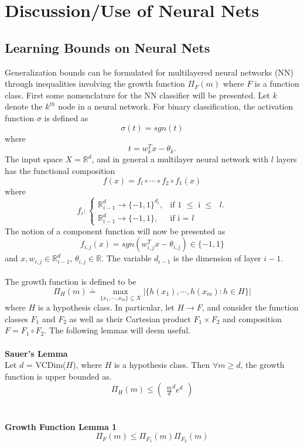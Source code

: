 \documentclass{article} %
\begin{document}
\section{Discussion/Use of Neural Nets}
\subsection{Learning Bounds on Neural Nets}
Generalization bounds can be formulated for multilayered neural networks (NN) through inequalities involving the growth function $\Pi_F(m)$ where $F$ is a function class. First some nomenclature for the NN classifier will be presented. Let $k$ denote the $k^{th}$ node in a neural network. For binary classification, the activation function $\sigma$ is defined as
$$
\sigma(t) = sgn(t)
$$
where
$$
t = w_k^Tx - \theta_k.
$$
The input space $X = \mathbb{R}^d$, and in general a multilayer neural network with $l$ layers has the functional composition
$$
f(x) = f_l \circ \cdots \circ f_2 \circ f_1 (x)
$$
where
$$
f_i : \begin{cases}
    \mathbb{R}^d_{i-1} \rightarrow \{-1,1\}^{d_i}, & \text{if 1 $\leq$ i $\leq$ $l$}.\\
    \mathbb{R}^d_{i-1} \rightarrow \{-1,1\}, & \text{if i = $l$}
  \end{cases}
$$
The notion of a component function will now be presented as
$$
f_{i,j}(x) = sgn(w_{i,j}^Tx - \theta_{i,j}) \in \{-1,1\}
$$
and $x,w_{i,j} \in \mathbb{R}^d_{i-1}$, $\theta_{i,j} \in \mathbb{R}$. The variable $d_{i-1}$ is the dimension of layer $i-1$.
\\
\\
The growth function is defined to be
$$
\Pi_H(m) \doteq \max_{\{x_1,\cdots,x_m\} \subseteq X} |\{h(x_1),\cdots,h(x_m) : h \in H \} |
$$
where $H$ is a hypothesis class. In particular, let $H \rightarrow F$, and consider the function classes $F_1$ and $F_2$ as well as their Cartesian product $F_1 \times F_2$ and composition $F = F_1 \circ F_2$. The following lemmas will deem useful.
\\
\\
\textbf{Sauer's Lemma}
\\
Let $d$ = VCDim($H$), where $H$ is a hypothesis class. Then $\forall m \geq d$, the growth function is upper bounded as.
$$
\Pi_H(m) \leq \begin{pmatrix}
\frac{m}{d}^de^d
\end{pmatrix}
$$
\\
\\
\textbf{Growth Function Lemma 1}
$$
\Pi_F(m) \leq \Pi_{F_1}(m)\Pi_{F_2}(m)
$$
\end{document}
